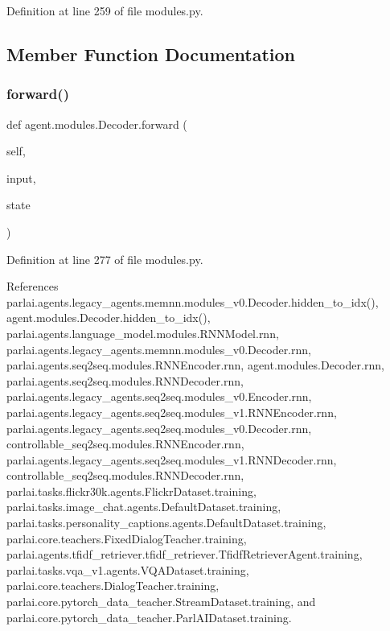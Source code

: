 Definition at line 259 of file modules.\+py.



\subsection{Member Function Documentation}
\mbox{\label{classagent_1_1modules_1_1Decoder_a4c609d3b51a4ef925c943c22a7a015e8}} 
\subsubsection{\texorpdfstring{forward()}{forward()}}
{\footnotesize\ttfamily def agent.\+modules.\+Decoder.\+forward (\begin{DoxyParamCaption}\item[{}]{self,  }\item[{}]{input,  }\item[{}]{state }\end{DoxyParamCaption})}



Definition at line 277 of file modules.\+py.



References parlai.\+agents.\+legacy\+\_\+agents.\+memnn.\+modules\+\_\+v0.\+Decoder.\+hidden\+\_\+to\+\_\+idx(), agent.\+modules.\+Decoder.\+hidden\+\_\+to\+\_\+idx(), parlai.\+agents.\+language\+\_\+model.\+modules.\+R\+N\+N\+Model.\+rnn, parlai.\+agents.\+legacy\+\_\+agents.\+memnn.\+modules\+\_\+v0.\+Decoder.\+rnn, parlai.\+agents.\+seq2seq.\+modules.\+R\+N\+N\+Encoder.\+rnn, agent.\+modules.\+Decoder.\+rnn, parlai.\+agents.\+seq2seq.\+modules.\+R\+N\+N\+Decoder.\+rnn, parlai.\+agents.\+legacy\+\_\+agents.\+seq2seq.\+modules\+\_\+v0.\+Encoder.\+rnn, parlai.\+agents.\+legacy\+\_\+agents.\+seq2seq.\+modules\+\_\+v1.\+R\+N\+N\+Encoder.\+rnn, parlai.\+agents.\+legacy\+\_\+agents.\+seq2seq.\+modules\+\_\+v0.\+Decoder.\+rnn, controllable\+\_\+seq2seq.\+modules.\+R\+N\+N\+Encoder.\+rnn, parlai.\+agents.\+legacy\+\_\+agents.\+seq2seq.\+modules\+\_\+v1.\+R\+N\+N\+Decoder.\+rnn, controllable\+\_\+seq2seq.\+modules.\+R\+N\+N\+Decoder.\+rnn, parlai.\+tasks.\+flickr30k.\+agents.\+Flickr\+Dataset.\+training, parlai.\+tasks.\+image\+\_\+chat.\+agents.\+Default\+Dataset.\+training, parlai.\+tasks.\+personality\+\_\+captions.\+agents.\+Default\+Dataset.\+training, parlai.\+core.\+teachers.\+Fixed\+Dialog\+Teacher.\+training, parlai.\+agents.\+tfidf\+\_\+retriever.\+tfidf\+\_\+retriever.\+Tfidf\+Retriever\+Agent.\+training, parlai.\+tasks.\+vqa\+\_\+v1.\+agents.\+V\+Q\+A\+Dataset.\+training, parlai.\+core.\+teachers.\+Dialog\+Teacher.\+training, parlai.\+core.\+pytorch\+\_\+data\+\_\+teacher.\+Stream\+Dataset.\+training, and parlai.\+core.\+pytorch\+\_\+data\+\_\+teacher.\+Parl\+A\+I\+Dataset.\+training.



